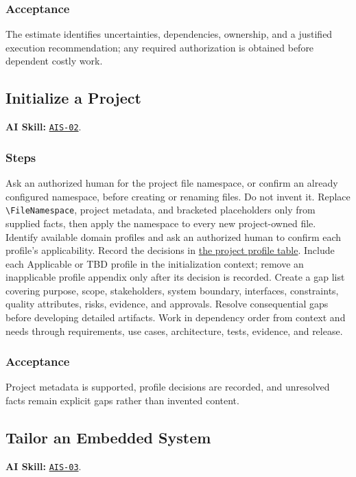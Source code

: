 \subsubsection*{Acceptance}
\label{Section:AIEstimateAcceptance}
The estimate identifies uncertainties, dependencies, ownership, and a justified execution recommendation; any required authorization is obtained before dependent costly work.

\subsection{Initialize a Project}
\label{Section:AIInitializeSteps}
\noindent\textbf{AI Skill:} \hyperref[Skill:AIS-02]{\texttt{AIS-02}}.

\subsubsection*{Steps}
\label{Section:AIInitializeTaskSteps}
Ask an authorized human for the project file namespace, or confirm an already
configured namespace, before creating or renaming files. Do not invent it.
Replace \verb|\FileNamespace|, project metadata, and bracketed placeholders
only from supplied facts, then apply the namespace to every new project-owned
file.
Identify available domain profiles and ask an authorized human to confirm each
profile's applicability. Record the decisions in
\hyperref[Table:ProjectDomainProfiles]{the project profile table}. Include each
Applicable or TBD profile in the initialization context; remove an
inapplicable profile appendix only after its decision is recorded.
Create a gap list covering purpose, scope, stakeholders, system boundary,
interfaces, constraints, quality attributes, risks, evidence, and approvals.
Resolve consequential gaps before developing detailed artifacts. Work in
dependency order from context and needs through requirements, use cases,
architecture, tests, evidence, and release.

\subsubsection*{Acceptance}
\label{Section:AIInitializeAcceptance}
Project metadata is supported, profile decisions are recorded, and unresolved facts remain explicit gaps rather than invented content.

\subsection{Tailor an Embedded System}
\label{Section:AIEmbeddedSteps}
\noindent\textbf{AI Skill:} \hyperref[Skill:AIS-03]{\texttt{AIS-03}}.


